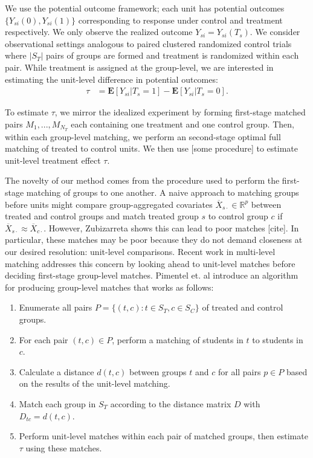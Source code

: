 \documentclass[aoas]{imsart}
\theoremstyle{plain}
\theoremstyle{definition}
\begin{document}
We use the potential outcome framework; each unit has potential outcomes $\{Y_{si}(0), Y_{si}(1)\}$ corresponding to response under control and treatment respectively. We only observe the realized outcome $Y_{si} = Y_{si}(T_{s})$. We consider observational settings analogous to paired clustered randomized control trials where $|S_T|$ pairs of groups are formed and treatment is randomized within each pair. While treatment is assigned at the group-level, we are interested in estimating the unit-level difference in potential outcomes:
\begin{align*}
  \tau &= \mathbf{E}[Y_{si} | T_s = 1 ] - \mathbf{E}[Y_{si} | T_s = 0].
\end{align*}

To estimate $\tau$, we mirror the idealized experiment by forming first-stage matched pairs $M_1, ..., M_{N_T}$ each containing one treatment and one control group. Then, within each group-level matching, we perform an second-stage optimal full matching of treated to control units. We then use [some procedure] to estimate unit-level treatment effect $\tau$. 

The novelty of our method comes from the procedure used to perform the first-stage matching of groups to one another.  A naive approach to matching groups before units might compare group-aggregated covariates $\overline{X}_{s \cdot} \in \mathbb{R}^p$ between treated and control groups and match treated group $s$ to control group $c$ if $\overline{X}_{s \cdot} \approx \overline{X}_{c \cdot}$. However, Zubizarreta shows this can lead to poor matches [cite]. In particular, these matches may be poor because they do not demand closeness at our desired resolution: unit-level comparisons. Recent work in multi-level matching addresses this concern by looking ahead to unit-level matches before deciding first-stage group-level matches. Pimentel et. al introduce an algorithm for producing group-level matches that works as follows:

\begin{enumerate}
  \item Enumerate all pairs $P = \{(t, c) : t\in S_T , c\in S_C\}$ of treated and control groups.
  \item For each pair $(t, c) \in P$, perform a matching of students in $t$ to students in $c$.
  \item Calculate a distance $d(t, c)$ between groups $t$ and $c$ for all pairs $p\in P$ based on the results of the unit-level matching.
  \item Match each group in $S_T$ according to the distance matrix $D$ with $D_{tc} = d(t,c)$.
  \item Perform unit-level matches within each pair of matched groups, then estimate $\tau$ using these matches.
\end{enumerate}
\end{document}
